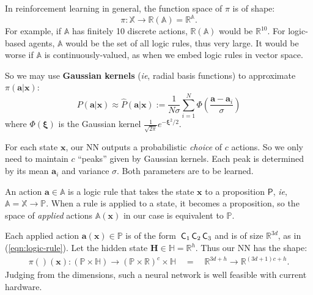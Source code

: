 \documentclass[orivec]{llncs}
\newcommand{\vect}[1]{\boldsymbol{#1}}
\begin{document}
In reinforcement learning in general, the function space of $\pi$ is of shape:
\begin{equation}
\pi : \mathbb{X} \rightarrow \mathbb{R} (\mathbb{A}) = \mathbb{R}^{\mathbb{A}} .
\end{equation}
For example, if $\mathbb{A}$ has finitely 10 discrete actions, $\mathbb{R}(\mathbb{A})$ would be $\mathbb{R}^{10}$.  For logic-based agents, $\mathbb{A}$ would be the set of all logic rules, thus very large.  It would be worse if $\mathbb{A}$ is continuously-valued, as when we embed logic rules in vector space.

So we may use \textbf{Gaussian kernels} (\textit{ie}, radial basis functions) to approximate $\pi(\vect{a} | \vect{x})$:
\begin{equation}
P(\vect{a} | \vect{x}) \approx \hat{P}(\vect{a} | \vect{x}) := \frac{1}{N \sigma} \sum_{i = 1}^{N} \Phi \left( \frac{\vect{a} - \vect{a}_i}{\sigma} \right)
\end{equation}
where $\Phi(\vect{\xi})$ is the Gaussian kernel $\frac{1}{\sqrt{2 \pi}} e^{- \vect{\xi}^2 / 2}$. 

For each state $\vect{x}$, our NN outputs a probabilistic \textit{choice} of $c$ actions.  So we only need to maintain $c$ ``peaks'' given by Gaussian kernels.  Each peak is determined by its mean $\vect{a}_i$ and variance $\sigma$.  Both parameters are to be learned.

An action $\vect{a} \in \mathbb{A}$ is a logic rule that takes the state $\vect{x}$ to a proposition $\mathsf{P}$, \textit{ie}, $\mathbb{A} = \mathbb{X} \rightarrow \mathbb{P}$.  When a rule is applied to a state, it becomes a proposition, so the space of \textit{applied} actions $\mathbb{A}(\vect{x})$ in our case is equivalent to $\mathbb{P}$.


Each applied action $\vect{a}(\vect{x}) \in \mathbb{P}$ is of the form $\,\mathsf{C}_1 \,\mathsf{C}_2 \,\mathsf{C}_3$ and is of size $\mathbb{R}^{3d}$, as in (\ref{eqn:logic-rule}).  Let the hidden state $\vect{H} \in \mathbb{H} = \mathbb{R}^h$.  Thus our NN has the shape:
\begin{eqnarray}
\pi()(\vect{x}): (\mathbb{P} \times \mathbb{H}) \rightarrow (\mathbb{P} \times \mathbb{R})^c \times \mathbb{H}
\quad = \quad \mathbb{R}^{3d + h} \rightarrow \mathbb{R}^{(3d + 1)c + h} .
\end{eqnarray}
Judging from the dimensions, such a neural network is well feasible with current hardware.
\end{document}
